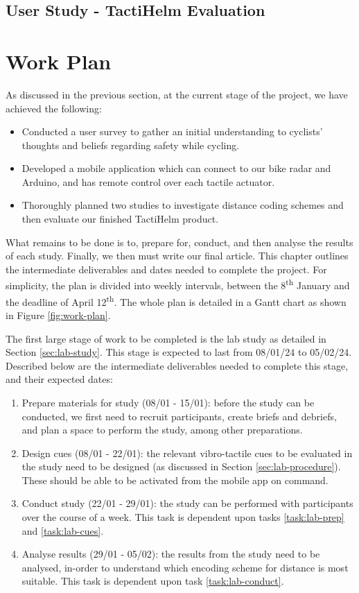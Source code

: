 \documentclass{interim}
\newcommand{\ts}{\textsuperscript}
\begin{document}
\subsection{User Study - TactiHelm Evaluation}\label{sec:user-study}

\section{Work Plan}
As discussed in the previous section, at the current stage of the project, we have achieved the following:
\begin{itemize}
    \item Conducted a user survey to gather an initial understanding to cyclists' thoughts and beliefs regarding safety while cycling.
    \item Developed a mobile application which can connect to our bike radar and Arduino, and has remote control over each tactile actuator.
    \item Thoroughly planned two studies to investigate distance coding schemes and then evaluate our finished TactiHelm product.
\end{itemize}
What remains to be done is to, prepare for, conduct, and then analyse the results of each study. Finally, we then must write our final article. This chapter outlines the intermediate deliverables and dates needed to complete the project. For simplicity, the plan is divided into weekly intervals, between the 8\ts{th} January and the deadline of April 12\ts{th}. The whole plan is detailed in a Gantt chart as shown in Figure \ref{fig:work-plan}.

The first large stage of work to be completed is the lab study as detailed in Section \ref{sec:lab-study}. This stage is expected to last from 08/01/24 to 05/02/24. Described below are the intermediate deliverables needed to complete this stage, and their expected dates: 
\begin{enumerate}[label=1.\arabic*]
    \item Prepare materials for study (08/01 - 15/01): before the study can be conducted, we first need to recruit participants, create briefs and debriefs, and plan a space to perform the study, among other preparations.\label{task:lab-prep}
    \item Design cues (08/01 - 22/01): the relevant vibro-tactile cues to be evaluated in the study need to be designed (as discussed in Section \ref{sec:lab-procedure}). These should be able to be activated from the mobile app on command. \label{task:lab-cues}
    \item Conduct study (22/01 - 29/01): the study can be performed with participants over the course of a week. This task is dependent upon tasks \ref{task:lab-prep} and \ref{task:lab-cues}. \label{task:lab-conduct}
    \item Analyse results (29/01 - 05/02): the results from the study need to be analysed, in-order to understand which encoding scheme for distance is most suitable. This task is dependent upon task \ref{task:lab-conduct}.
\end{enumerate}
\end{document}
